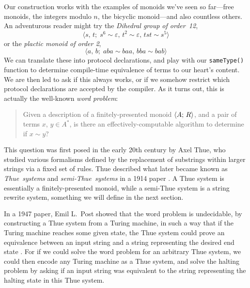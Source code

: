 \documentclass[../generics]{subfiles}
\begin{document}
Our construction works with the examples of monoids we've seen so far---free monoids, the integers modulo $n$, the bicyclic monoid---and also countless others. An adventurous reader might try the \emph{Dihedral group of order~12},
\[\langle s,\,t;\; s^6\sim\varepsilon,\, t^2\sim\varepsilon,\, tst\sim s^5\rangle\]
or the \emph{plactic monoid of order 2},
\[\langle a,\,b;\; aba\sim baa,\, bba\sim bab\rangle\]
We can translate these into protocol declarations, and play with our \texttt{sameType()} function to determine compile-time equivalence of terms to our heart's content. We are then led to ask if this always works, or if we somehow restrict which protocol declarations are accepted by the compiler. As it turns out, this is actually the well-known \emph{word problem}:
\begin{quote}
Given a description of a finitely-presented monoid $\langle A;\,R\rangle$, and a pair of terms $x$, $y\in A^*$, is there an effectively-computable algorithm to determine if $x\sim y$?
\end{quote}

This question was first posed in the early 20th century by Axel Thue, who studied various formalisms defined by the replacement of substrings within larger strings via a fixed set of rules. Thue described what later became known as \emph{Thue~systems} and \emph{semi-Thue~systems} in a 1914 paper \cite{thue_translation}. A Thue system is essentially a finitely-presented monoid, while a semi-Thue system is a string rewrite system, something we will define in the next section.

In a 1947 paper, Emil L.~Post showed that the word problem is undecidable, by constructing a Thue system from a Turing machine, in such a way that if the Turing machine reaches some given state, the Thue system could prove an equivalence between an input string and a string representing the desired end state \cite{post_1947}. For if we could solve the word problem for an arbitrary Thue system, we could then encode any Turing machine as a Thue system, and solve the halting problem by asking if an input string was equivalent to the string representing the halting state in this Thue system.
\end{document}
